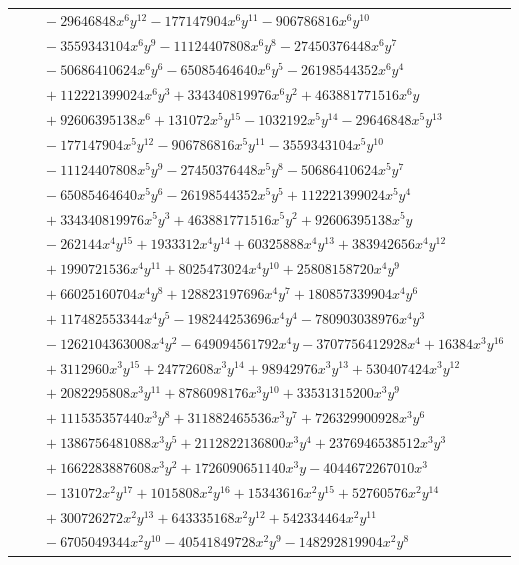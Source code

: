 \documentclass[11pt]{article}
\begin{document}
\begin{longtable}{@{}ll@{}}
 & $\quad -29646848x^{6}y^{12}-177147904x^{6}y^{11}-906786816x^{6}y^{10}$\\
 & $\quad -3559343104x^{6}y^{9}-11124407808x^{6}y^{8}-27450376448x^{6}y^{7}$\\
 & $\quad -50686410624x^{6}y^{6}-65085464640x^{6}y^{5}-26198544352x^{6}y^{4}$\\
 & $\quad +112221399024x^{6}y^{3}+334340819976x^{6}y^{2}+463881771516x^{6}y$\\
 & $\quad +92606395138x^{6}+131072x^{5}y^{15}-1032192x^{5}y^{14}-29646848x^{5}y^{13}$\\
 & $\quad -177147904x^{5}y^{12}-906786816x^{5}y^{11}-3559343104x^{5}y^{10}$\\
 & $\quad -11124407808x^{5}y^{9}-27450376448x^{5}y^{8}-50686410624x^{5}y^{7}$\\
 & $\quad -65085464640x^{5}y^{6}-26198544352x^{5}y^{5}+112221399024x^{5}y^{4}$\\
 & $\quad +334340819976x^{5}y^{3}+463881771516x^{5}y^{2}+92606395138x^{5}y$\\
 & $\quad -262144x^{4}y^{15}+1933312x^{4}y^{14}+60325888x^{4}y^{13}+383942656x^{4}y^{12}$\\
 & $\quad +1990721536x^{4}y^{11}+8025473024x^{4}y^{10}+25808158720x^{4}y^{9}$\\
 & $\quad +66025160704x^{4}y^{8}+128823197696x^{4}y^{7}+180857339904x^{4}y^{6}$\\
 & $\quad +117482553344x^{4}y^{5}-198244253696x^{4}y^{4}-780903038976x^{4}y^{3}$\\
 & $\quad -1262104363008x^{4}y^{2}-649094561792x^{4}y-3707756412928x^{4}+16384x^{3}y^{16}$\\
 & $\quad +3112960x^{3}y^{15}+24772608x^{3}y^{14}+98942976x^{3}y^{13}+530407424x^{3}y^{12}$\\
 & $\quad +2082295808x^{3}y^{11}+8786098176x^{3}y^{10}+33531315200x^{3}y^{9}$\\
 & $\quad +111535357440x^{3}y^{8}+311882465536x^{3}y^{7}+726329900928x^{3}y^{6}$\\
 & $\quad +1386756481088x^{3}y^{5}+2112822136800x^{3}y^{4}+2376946538512x^{3}y^{3}$\\
 & $\quad +1662283887608x^{3}y^{2}+1726090651140x^{3}y-4044672267010x^{3}$\\
 & $\quad -131072x^{2}y^{17}+1015808x^{2}y^{16}+15343616x^{2}y^{15}+52760576x^{2}y^{14}$\\
 & $\quad +300726272x^{2}y^{13}+643335168x^{2}y^{12}+542334464x^{2}y^{11}$\\
 & $\quad -6705049344x^{2}y^{10}-40541849728x^{2}y^{9}-148292819904x^{2}y^{8}$\\

\end{longtable}
\end{document}

